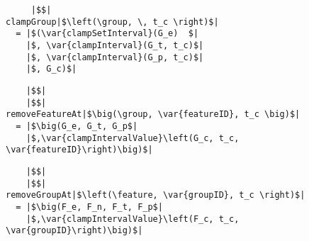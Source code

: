 \begin{figure}
\begin{minipage}{0.5\textwidth}
  \begin{verbatim}
     |$$|
clampGroup|$\left(\group, \, t_c \right)$|
  = |$(\var{clampSetInterval}(G_e)  $|
    |$, \var{clampInterval}(G_t, t_c)$|
    |$, \var{clampInterval}(G_p, t_c)$|
    |$, G_c)$|
  \end{verbatim}
  \label{fun:clamp-group}
\end{minipage}

\begin{minipage}{0.6\textwidth}
  \begin{verbatim}
    |$$|
    |$$|
removeFeatureAt|$\big(\group, \var{featureID}, t_c \big)$|
  = |$\big(G_e, G_t, G_p$|
    |$,\var{clampIntervalValue}\left(G_c, t_c, \var{featureID}\right)\big)$|
  \end{verbatim}
  \label{fun:remove-feature-at}
\end{minipage}

\begin{minipage}{0.6\textwidth}
  \begin{verbatim}
    |$$|
    |$$|
removeGroupAt|$\left(\feature, \var{groupID}, t_c \right)$|
  = |$\big(F_e, F_n, F_t, F_p$|
    |$,\var{clampIntervalValue}\left(F_c, t_c, \var{groupID}\right)\big)$|
  \end{verbatim}
  \label{fun:remove-group-at}
\end{minipage}
\end{figure}

